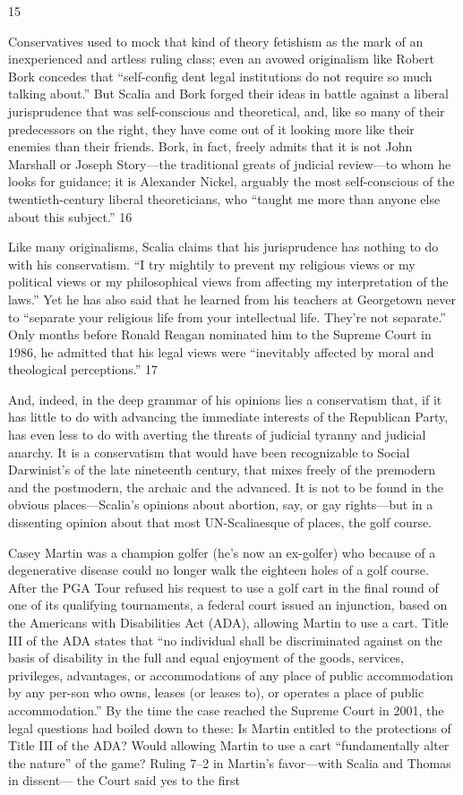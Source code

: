 {\color{blue} 15 } {\par} Conservatives used to mock that kind of theory fetishism as the mark of an inexperienced and artless ruling class; even an avowed originalism like Robert Bork concedes that “self-config dent legal institutions do not require so much talking about.” But Scalia and Bork forged their ideas in battle against a liberal jurisprudence that was self-conscious and theoretical, and, like so many of their predecessors on the right, they have come out of it looking more like their enemies than their friends. Bork, in fact, freely admits that it is not John Marshall or Joseph Story—the traditional greats of judicial review—to whom he looks for guidance; it is Alexander Nickel, arguably the most self-conscious of the twentieth-century liberal theoreticians, who “taught me more than anyone else about this subject.” {\color{blue} 16 } {\par} Like many originalisms, Scalia claims that his jurisprudence has nothing to do with his conservatism. “I try mightily to prevent my religious views or my political views or my philosophical views from affecting my interpretation of the laws.” Yet he has also said that he learned from his teachers at Georgetown never to “separate your religious life from your intellectual life. They’re not separate.” Only months before Ronald Reagan nominated him to the Supreme Court in 1986, he admitted that his legal views were “inevitably affected by moral and theological perceptions.” {\color{blue} 17 } {\par} And, indeed, in the deep grammar of his opinions lies a conservatism that, if it has little to do with advancing the immediate interests of the Republican Party, has even less to do with averting the threats of judicial tyranny and judicial anarchy. It is a conservatism that would have been recognizable to Social Darwinist's of the late nineteenth century, that mixes freely of the premodern and the postmodern, the archaic and the advanced. It is not to be found in the obvious places—Scalia’s opinions about abortion, say, or gay rights—but in a dissenting opinion about that most UN-Scaliaesque of places, the golf course.{\par} Casey Martin was a champion golfer (he’s now an ex-golfer) who because of a degenerative disease could no longer walk the eighteen holes of a golf course. After the PGA Tour refused his request to use a golf cart in the final round of one of its qualifying tournaments, a federal court issued an injunction, based on the Americans with Disabilities Act (ADA), allowing Martin to use a cart. Title III of the ADA states that “no individual shall be discriminated against on the basis of disability in the full and equal enjoyment of the goods, services, privileges, advantages, or accommodations of any place of public accommodation by any per-son who owns, leases (or leases to), or operates a place of public accommodation.” By the time the case reached the Supreme Court in 2001, the legal questions had boiled down to these: Is Martin entitled to the protections of Title III of the ADA? Would allowing Martin to use a cart “fundamentally alter the nature” of the game? Ruling 7–2 in Martin’s favor—with Scalia and Thomas in dissent— the Court said yes to the first 